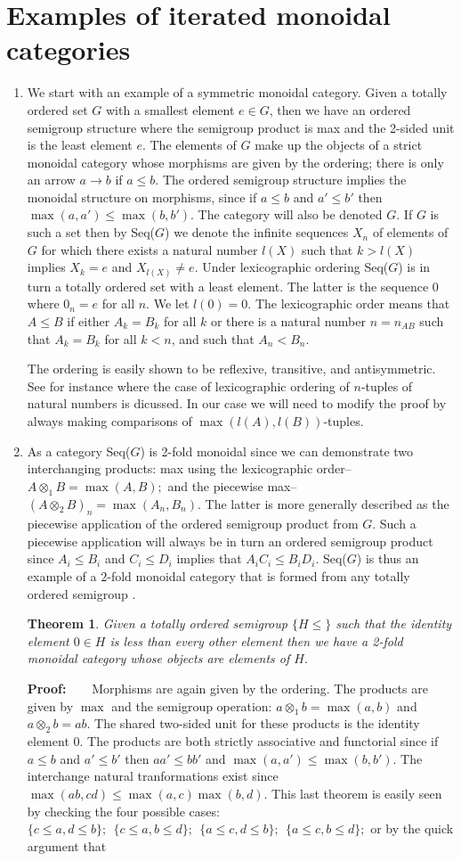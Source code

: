 \documentclass{tac}
\newtheorem{theorem}{Theorem}
\newcommand{\MySection}[1]
{\section{ #1}}
\begin{document}
{\newpage   
\MySection{Examples of iterated monoidal categories} 
\begin{enumerate}
\item
We start with an example of a symmetric monoidal category. Given a totally ordered set $G$ with a smallest element $e \in G$, 
then we have an ordered semigroup structure where the semigroup product is max and the 2-sided unit is the
least element $e$. The elements of $G$ make up the objects of a strict monoidal category whose morphisms are
given by the ordering; there is only an arrow $a \to b$ if $a\le b.$ The ordered semigroup structure implies
the monoidal structure on morphisms, since if $a\le b$ and $a'\le b'$ 
 then $\max(a,a')\le\max(b,b').$ The category will also be denoted $G.$ 
If $G$ is such a set then by Seq($G$) we denote the infinite sequences $X_n$ of elements of $G$ for which
there exists a natural number $l(X)$ such that $k> l(X)$ implies $X_k = e$ and $X_{l(X)}\ne e.$ 
Under lexicographic ordering Seq($G$) is
in turn a totally ordered set with a least element. The latter is the sequence 0 where $0_n = e$ for all $n.$
We let $l(0) = 0.$
The lexicographic order
means that $A \le B$ if either $A_k = B_k$ for all $k$ or there is a natural number $n=n_{AB}$ such that 
$A_k = B_k$ for all $k < n$, and such that $A_{n} < B_{n}.$ 

The ordering is easily shown to be reflexive, transitive, and antisymmetric. See for instance \cite{Schrod}
where the case of lexicographic ordering of $n$-tuples of natural numbers is dicussed. In our case we will need
to modify the proof by always making comparisons of $\max(l(A),l(B))$-tuples. 
\item
As a category Seq($G$) is 2-fold monoidal since 
we can demonstrate two interchanging products: max using the lexicographic order-- $A\otimes_1 B = \max(A,B);$ 
and the piecewise max-- $(A \otimes_2 B)_n = \max(A_n, B_n).$ The latter is  more generally described as
the piecewise application of the ordered semigroup product from $G.$ Such a piecewise application
will always be in turn an ordered
semigroup product since $A_i \le B_i$ and $C_i \le D_i$
implies that $A_iC_i \le B_iD_i$. Seq($G$) is thus an example of 
a $2$-fold monoidal category that is formed from any totally ordered semigroup . 
\begin{theorem}\label{semi}
Given a totally ordered semigroup $\{H\le\}$
such that the
identity element $0 \in H$ is less than every other element then 
we have a 2-fold monoidal category whose
objects are elements of $H.$ 
\end{theorem}
{\bf Proof:~~~} Morphisms
are again given by the ordering. The products are given by
 $\max$ and the semigroup operation: $a\otimes_1b = \max(a,b)$ and $a\otimes_2b = ab$. 
 The shared two-sided unit for these products is 
 the identity element $0.$ The products are both strictly associative and functorial since if $a\le b$ and $a'\le b'$ 
 then $aa'\le bb'$ and $\max(a,a')\le\max(b,b').$
 The interchange natural tranformations exist since $\max(ab,cd)\le\max(a,c)\max(b,d).$ This last theorem is easily seen by checking the four
 possible cases: $\{c\le a, d\le b\};~~\{c\le a, b\le d\};~~\{a\le c, d\le b\};~~\{a\le c, b\le d\};$ or by the 
 quick argument that
 

\end{enumerate}}
\end{document}
